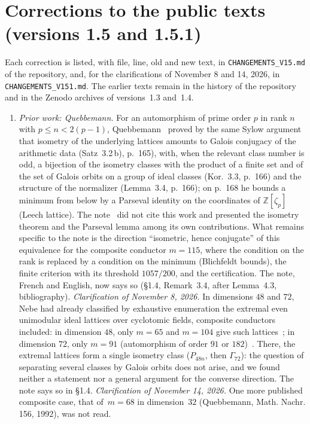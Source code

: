 \documentclass[11pt,a4paper]{amsart}
\theoremstyle{plain}
\theoremstyle{definition}
\newcommand{\Z}{\mathbb{Z}}
\begin{document}
\section{Corrections to the public texts (versions 1.5 and 1.5.1)}\label{sec:corrections}
Each correction is listed, with file, line, old and new text, in \texttt{CHANGEMENTS\_V15.md} of the repository, and, for the clarifications of November 8 and 14, 2026, in \texttt{CHANGEMENTS\_V151.md}. The earlier texts remain in the history of the repository and in the Zenodo archives of versions~1.3 and~1.4.
\begin{enumerate}[label=\textup{(\arabic*)}]
\item \emph{Prior work: Quebbemann.} For an automorphism of prime order $p$ in rank $n$ with $p\le n<2(p-1)$, Quebbemann~\cite[\S3]{Que81} proved by the same Sylow argument that isometry of the underlying lattices amounts to Galois conjugacy of the arithmetic data (Satz~3.2\,b), p.~165), with, when the relevant class number is odd, a bijection of the isometry classes with the product of a finite set and of the set of Galois orbits on a group of ideal classes (Kor.~3.3, p.~166) and the structure of the normalizer (Lemma~3.4, p.~166); on p.~168 he bounds a minimum from below by a Parseval identity on the coordinates of $\Z[\zeta_p]$ (Leech lattice). The note~\cite{Gau26} did not cite this work and presented the isometry theorem and the Parseval lemma among its own contributions. What remains specific to the note is the direction ``isometric, hence conjugate'' of this equivalence for the composite conductor $m=115$, where the condition on the rank is replaced by a condition on the minimum (Blichfeldt bounds), the finite criterion with its threshold $1057/200$, and the certification. The note, French and English, now says so (\S1.4, Remark~3.4, after Lemma~4.3, bibliography). \emph{Clarification of November 8, 2026.} In dimensions $48$ and $72$, Nebe had already classified by exhaustive enumeration the extremal even unimodular ideal lattices over cyclotomic fields, composite conductors included: in dimension $48$, only $m=65$ and $m=104$ give such lattices~\cite[Thm.~5.3]{Neb13}; in dimension $72$, only $m=91$ (automorphism of order $91$ or $182$)~\cite[Thm.~4.5]{Neb16}. There, the extremal lattices form a single isometry class ($P_{48n}$, then $\Gamma_{72}$): the question of separating several classes by Galois orbits does not arise, and we found neither a statement nor a general argument for the converse direction. The note says so in \S1.4. \emph{Clarification of November 14, 2026.} One more published composite case, that of~$m=68$ in dimension~$32$ (Quebbemann, Math. Nachr. 156, 1992), was not read.

\end{enumerate}
\end{document}
